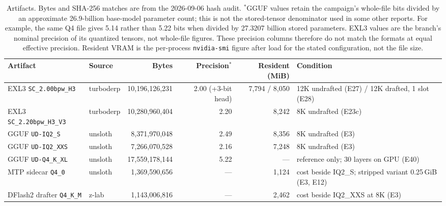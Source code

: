 \documentclass[11pt]{article}
\newcommand{\q}[1]{\texttt{#1}}
\begin{document}
\begin{table}[t]
\centering
\scriptsize
\setlength{\tabcolsep}{4pt}
\begin{tabular}{llrrrL{3.9cm}}
\toprule
Artifact & Source & Bytes & Precision$^*$ & Resident (MiB) & Condition \\
\midrule
EXL3 \q{SC\_2.00bpw\_H3} & turboderp & 10,196,126,231 & 2.00 (+3-bit head) & 7,794 / 8,050 & 12K undrafted (E27) / 12K drafted, 1 slot (E28) \\
EXL3 \q{SC\_2.20bpw\_H3\_V3} & turboderp & 10,280,960,404 & 2.20 & 8,242 & 8K undrafted (E23c) \\
GGUF \q{UD-IQ2\_S} & unsloth & 8,371,970,048 & 2.49 & 8,356 & 8K undrafted (E3) \\
GGUF \q{UD-IQ2\_XXS} & unsloth & 7,266,070,528 & 2.16 & 7,248 & 8K undrafted (E3) \\
GGUF \q{UD-Q4\_K\_XL} & unsloth & 17,559,178,144 & 5.22 & --- & reference only; 30 layers on GPU (E40) \\
MTP sidecar \q{Q4\_0} & unsloth & 1,369,590,656 & --- & 1,124 & cost beside IQ2\_S; stripped variant 0.25\,GiB (E3, E12) \\
DFlash2 drafter \q{Q4\_K\_M} & z-lab & 1,143,006,816 & --- & 2,462 & cost beside IQ2\_XXS at 8K (E3) \\
\bottomrule
\end{tabular}
\caption{Artifacts. Bytes and SHA-256 matches are from the 2026-09-06 hash
audit. $^*$GGUF values retain the campaign's whole-file bits divided by
an approximate 26.9-billion base-model parameter count; this is not the
stored-tensor denominator used in some other reports. For example, the same
Q4 file gives 5.14 rather than 5.22 bits when divided by 27.3207 billion
stored parameters. EXL3 values are the branch's nominal precision of its
quantized tensors, not whole-file figures. These precision columns therefore
do not match the formats at equal effective precision. Resident VRAM is the per-process
\q{nvidia-smi} figure after load for the stated configuration, not the file
size.}
\label{tab:artifacts}
\end{table}
\end{document}
